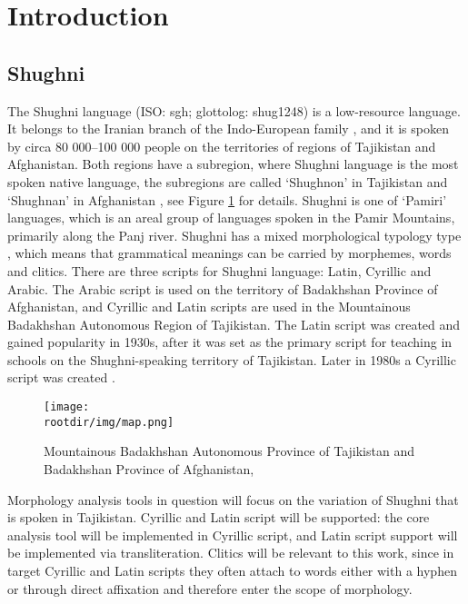 \newpage

\section{Introduction}
\subsection{Shughni}
\par The Shughni language (ISO: sgh; glottolog: shug1248) is a low-resource language. It belongs to the Iranian branch of the Indo-European family \parencite[12]{plungian_study_2022}, and it is spoken by circa 80 000--100 000 people \parencite{edelman_dodykhudoeva_shughni_2009} on the territories of regions of Tajikistan and Afghanistan. Both regions have a subregion, where Shughni language is the most spoken native language, the subregions are called `Shughnon' in Tajikistan and `Shughnan' in Afghanistan \parencite[2]{parker_shughni_2023}, see Figure \ref{fig:map1} for details. Shughni is one of `Pamiri' languages, which is an areal group of languages spoken in the Pamir Mountains, primarily along the Panj river. Shughni has a mixed morphological typology type \parencite[94]{parker_shughni_2023}, which means that grammatical meanings can be carried by morphemes, words and clitics. There are three scripts for Shughni language: Latin, Cyrillic and Arabic. The Arabic script is used on the territory of Badakhshan Province of Afghanistan, and Cyrillic and Latin scripts are used in the Mountainous Badakhshan Autonomous Region of Tajikistan. The Latin script was created and gained popularity in 1930s, after it was set as the primary script for teaching in schools on the Shughni-speaking territory of Tajikistan. Later in 1980s a Cyrillic script was created \parencite[788]{edelman_dodykhudoeva_shughni_2009}.
\begin{figure}[h]
    \centering
    \texttt{[image: \\rootdir/img/map.png]}
    \caption{Mountainous Badakhshan Autonomous Province of Tajikistan and Badakhshan Province of Afghanistan, \parencite[Fig 1.1]{parker_shughni_2023}}
    \label{fig:map1}
\end{figure}
\par Morphology analysis tools in question will focus on the variation of Shughni that is spoken in Tajikistan. Cyrillic and Latin script will be supported: the core analysis tool will be implemented in Cyrillic script, and Latin script support will be implemented via transliteration. Clitics will be relevant to this work, since in target Cyrillic and Latin scripts they often attach to words either with a hyphen or through direct affixation and therefore enter the scope of morphology.

